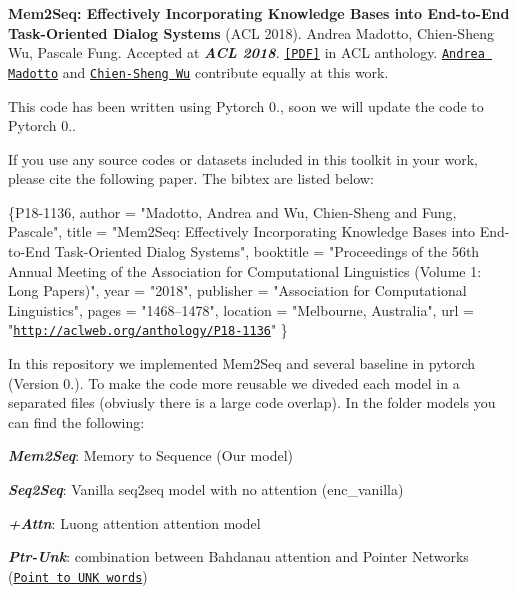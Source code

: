 {\bfseries Mem2\+Seq\+: Effectively Incorporating Knowledge Bases into End-\/to-\/\+End Task-\/\+Oriented Dialog Systems} (A\+CL 2018). Andrea Madotto, Chien-\/\+Sheng Wu, Pascale Fung. Accepted at {\itshape {\bfseries A\+CL 2018}}. \href{https://aclanthology.coli.uni-saarland.de/papers/P18-1136/p18-1136}{\tt \mbox{[}P\+DF\mbox{]}} in A\+CL anthology. \href{http://andreamad8.github.io/}{\tt Andrea Madotto} and \href{https://jasonwu0731.github.io/}{\tt Chien-\/\+Sheng Wu} contribute equally at this work.

This code has been written using Pytorch 0., soon we will update the code to Pytorch 0..

If you use any source codes or datasets included in this toolkit in your work, please cite the following paper. The bibtex are listed below\+: 
\begin{DoxyPre}
\{P18-1136,
  author =  "Madotto, Andrea
        and Wu, Chien-Sheng
        and Fung, Pascale",
  title =   "Mem2Seq: Effectively Incorporating Knowledge Bases into End-to-End Task-Oriented Dialog Systems",
  booktitle =   "Proceedings of the 56th Annual Meeting of the Association for Computational Linguistics (Volume 1: Long Papers)",
  year =    "2018",
  publisher =   "Association for Computational Linguistics",
  pages =   "1468--1478",
  location =    "Melbourne, Australia",
  url =     "\href{http://aclweb.org/anthology/P18-1136}{\tt http://aclweb.org/anthology/P18-1136}"
\}\end{DoxyPre}



\begin{DoxyPre}\end{DoxyPre}


 

In this repository we implemented Mem2\+Seq and several baseline in pytorch (Version 0.). To make the code more reusable we diveded each model in a separated files (obviusly there is a large code overlap). In the folder models you can find the following\+:
\begin{DoxyItemize}
\item {\itshape {\bfseries Mem2\+Seq}}\+: Memory to Sequence (Our model)
\item {\itshape {\bfseries Seq2\+Seq}}\+: Vanilla seq2seq model with no attention (enc\+\_\+vanilla)
\item {\itshape {\bfseries +\+Attn}}\+: Luong attention attention model
\item {\itshape {\bfseries Ptr-\/\+Unk}}\+: combination between Bahdanau attention and Pointer Networks (\href{http://www.aclweb.org/anthology/P16-1014}{\tt Point to U\+NK words})
\end{DoxyItemize}

